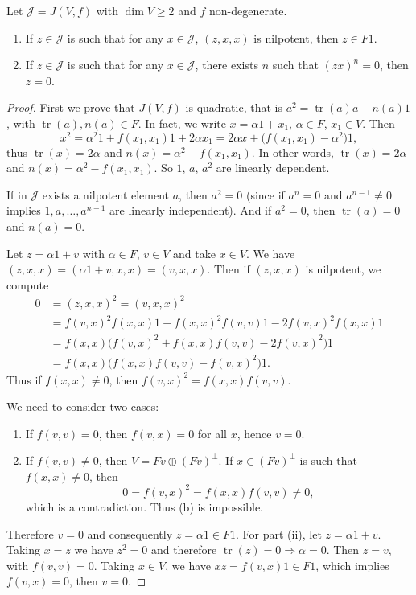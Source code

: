 \documentclass{article}
\begin{document}
\begin{lemma}
Let $\mathcal{J}=J(V,f)$ with $\dim V \geqslant 2$ and $f$ non-degenerate.
\begin{enumerate}
\item[(i)] If $z \in \mathcal{J}$ is such that for any $x \in \mathcal{J}$, $(z,x,x)$ is nilpotent, then $z \in F1$.
\item[(ii)] If $z \in \mathcal{J}$ is such that for any $x \in \mathcal{J}$, there exists $n$ such that $(zx)^n=0$, then $z=0$.
\end{enumerate}
\end{lemma}

\begin{proof}
First we prove that $J(V,f)$ is quadratic, that is $a^2=\operatorname{tr}(a)a-n(a)1$, with $\operatorname{tr}(a),n(a) \in F$. In fact, we write $x=\alpha 1+x_1$, $\alpha \in F$, $x_1 \in V$. Then
\[
x^2=\alpha^2 1+f(x_1,x_1)1+2\alpha x_1=2\alpha x+\bigl(f(x_1,x_1)-\alpha^2\bigr)1,
\]
thus $\operatorname{tr}(x)=2\alpha$ and $n(x)=\alpha^2-f(x_1,x_1)$. In other words, $\operatorname{tr}(x)=2\alpha$ and $n(x)=\alpha^2-f(x_1,x_1)$. So $1$, $a$, $a^2$ are linearly dependent.

If in $\mathcal{J}$ exists a nilpotent element $a$, then $a^2=0$ (since if $a^n=0$ and $a^{n-1}\neq0$ implies $1,a,\dots,a^{n-1}$ are linearly independent). And if $a^2=0$, then $\operatorname{tr}(a)=0$ and $n(a)=0$.

Let $z=\alpha 1+v$ with $\alpha \in F$, $v \in V$ and take $x \in V$. We have $(z,x,x)=(\alpha 1+v,x,x)=(v,x,x)$. Then if $(z,x,x)$ is nilpotent, we compute
\begin{align*}
0&=(z,x,x)^2=(v,x,x)^2 \\
&=f(v,x)^2 f(x,x)1+f(x,x)^2 f(v,v)1-2f(v,x)^2 f(x,x)1 \\
&=f(x,x)\bigl(f(v,x)^2+f(x,x)f(v,v)-2f(v,x)^2\bigr)1 \\
&=f(x,x)\bigl(f(x,x)f(v,v)-f(v,x)^2\bigr)1.
\end{align*}
Thus if $f(x,x)\neq0$, then $f(v,x)^2=f(x,x)f(v,v)$.

We need to consider two cases:
\begin{enumerate}
\item[(a)] If $f(v,v)=0$, then $f(v,x)=0$ for all $x$, hence $v=0$.
\item[(b)] If $f(v,v)\neq0$, then $V=Fv\oplus(Fv)^\perp$. If $x \in (Fv)^\perp$ is such that $f(x,x)\neq0$, then
\[
0=f(v,x)^2=f(x,x)f(v,v)\neq0,
\]
which is a contradiction. Thus (b) is impossible.
\end{enumerate}
Therefore $v=0$ and consequently $z=\alpha 1 \in F1$. For part (ii), let $z=\alpha 1+v$. Taking $x=z$ we have $z^2=0$ and therefore $\operatorname{tr}(z)=0 \Rightarrow \alpha=0$. Then $z=v$, with $f(v,v)=0$. Taking $x \in V$, we have $xz=f(v,x)1 \in F1$, which implies $f(v,x)=0$, then $v=0$.
\end{proof}
\end{document}
